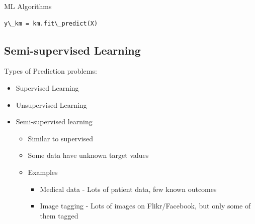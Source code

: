 \documentclass{beamer}
\begin{document}
\begin{frame}[allowframebreaks]{ML Algorithms}
\begin{lstlisting}
y\_km = km.fit\_predict(X)
\end{lstlisting}

\framebreak
\subsection{Semi-supervised Learning}
Types of Prediction problems:
\begin{itemize}
\item Supervised Learning
\item Unsupervised Learning
\item Semi-supervised learning
\begin{itemize}
    \item Similar to supervised
    \item Some data have unknown target values
    \item[] Examples
    \begin{itemize}
    \item Medical data - Lots of patient data, few known outcomes
    \item Image tagging - Lots of images on Flikr/Facebook, but only some of them tagged
    \end{itemize}
\end{itemize}
\end{itemize}

\framebreak

\end{frame}
\end{document}
